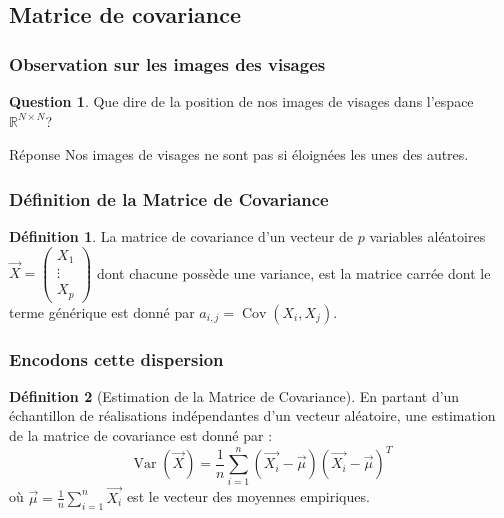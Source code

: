 \documentclass{beamer}
\theoremstyle{plain}
\theoremstyle{definition}
\newtheorem{defi}{Définition}
\newtheorem{qst}{Question}
\DeclareMathOperator\Var{Var}
\DeclareMathOperator\Cov{Cov}
\begin{document}
\subsection{Matrice de covariance}



\begin{frame}  
  \frametitle{Observation sur les images des visages}
  \begin{qst}
    Que dire de la position de nos images de visages dans l'espace $\mathbb{R}^{N \times N}$?
  \end{qst}
  \pause
  \begin{exampleblock}{Réponse}
    Nos images de visages ne sont pas si éloignées les unes des autres. 
  \end{exampleblock}
\end{frame}



\begin{frame}
  \frametitle{Définition de la Matrice de Covariance}  
  \begin{defi}
    La matrice de covariance d'un vecteur de $p$ variables aléatoires $\overrightarrow{X} =
    \begin{pmatrix}
      X_1 \\
      \vdots \\
      X_p
    \end{pmatrix}$ dont chacune possède une variance, est la matrice carrée dont le terme générique est donné par $a_{i,j} = \Cov(X_i,X_j)$.
  \end{defi}
\end{frame}



\begin{frame}
  \frametitle{Encodons cette dispersion}  
  \begin{defi}[Estimation de la Matrice de Covariance]
    En partant d’un échantillon de réalisations indépendantes d’un vecteur aléatoire, une estimation de la matrice de covariance est donné par :
    \[
      \Var(\overrightarrow{X}) = \frac{1}{n} \displaystyle\sum_{i=1}^{n} (\overrightarrow{X_i} - \overrightarrow{\mu})(\overrightarrow{X_i}-\overrightarrow{\mu})^T
    \]
    où $\overrightarrow{\mu} = \frac{1}{n} \displaystyle\sum_{i=1}^{n}\overrightarrow{X_i}$ est le vecteur des moyennes empiriques.
  \end{defi}
\end{frame}
\end{document}
